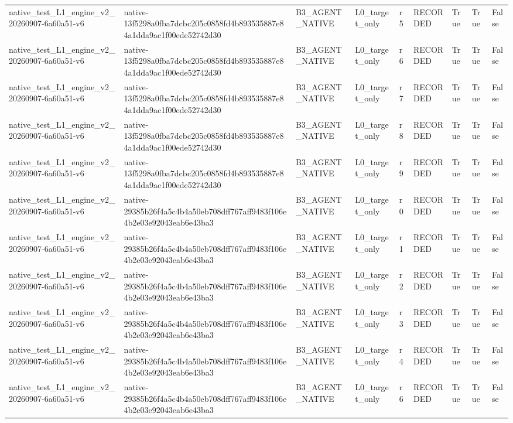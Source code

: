 \begin{tabular}{lllllllll}
native\_test\_L1\_engine\_v2\_20260907-6a60a51-v6 & native-13f5298a0fba7dcbc205c0858fd4b893535887e84a1dda9ac1f00ede52742d30 & B3\_AGENT\_NATIVE & L0\_target\_only & r5 & RECORDED & True & True & False \\
native\_test\_L1\_engine\_v2\_20260907-6a60a51-v6 & native-13f5298a0fba7dcbc205c0858fd4b893535887e84a1dda9ac1f00ede52742d30 & B3\_AGENT\_NATIVE & L0\_target\_only & r6 & RECORDED & True & True & False \\
native\_test\_L1\_engine\_v2\_20260907-6a60a51-v6 & native-13f5298a0fba7dcbc205c0858fd4b893535887e84a1dda9ac1f00ede52742d30 & B3\_AGENT\_NATIVE & L0\_target\_only & r7 & RECORDED & True & True & False \\
native\_test\_L1\_engine\_v2\_20260907-6a60a51-v6 & native-13f5298a0fba7dcbc205c0858fd4b893535887e84a1dda9ac1f00ede52742d30 & B3\_AGENT\_NATIVE & L0\_target\_only & r8 & RECORDED & True & True & False \\
native\_test\_L1\_engine\_v2\_20260907-6a60a51-v6 & native-13f5298a0fba7dcbc205c0858fd4b893535887e84a1dda9ac1f00ede52742d30 & B3\_AGENT\_NATIVE & L0\_target\_only & r9 & RECORDED & True & True & False \\
native\_test\_L1\_engine\_v2\_20260907-6a60a51-v6 & native-29385b26f4a5c4b4a50eb708dff767aff9483f106e4b2e03e92043eab6e43ba3 & B3\_AGENT\_NATIVE & L0\_target\_only & r0 & RECORDED & True & True & False \\
native\_test\_L1\_engine\_v2\_20260907-6a60a51-v6 & native-29385b26f4a5c4b4a50eb708dff767aff9483f106e4b2e03e92043eab6e43ba3 & B3\_AGENT\_NATIVE & L0\_target\_only & r1 & RECORDED & True & True & False \\
native\_test\_L1\_engine\_v2\_20260907-6a60a51-v6 & native-29385b26f4a5c4b4a50eb708dff767aff9483f106e4b2e03e92043eab6e43ba3 & B3\_AGENT\_NATIVE & L0\_target\_only & r2 & RECORDED & True & True & False \\
native\_test\_L1\_engine\_v2\_20260907-6a60a51-v6 & native-29385b26f4a5c4b4a50eb708dff767aff9483f106e4b2e03e92043eab6e43ba3 & B3\_AGENT\_NATIVE & L0\_target\_only & r3 & RECORDED & True & True & False \\
native\_test\_L1\_engine\_v2\_20260907-6a60a51-v6 & native-29385b26f4a5c4b4a50eb708dff767aff9483f106e4b2e03e92043eab6e43ba3 & B3\_AGENT\_NATIVE & L0\_target\_only & r4 & RECORDED & True & True & False \\
native\_test\_L1\_engine\_v2\_20260907-6a60a51-v6 & native-29385b26f4a5c4b4a50eb708dff767aff9483f106e4b2e03e92043eab6e43ba3 & B3\_AGENT\_NATIVE & L0\_target\_only & r6 & RECORDED & True & True & False \\

\end{tabular}
